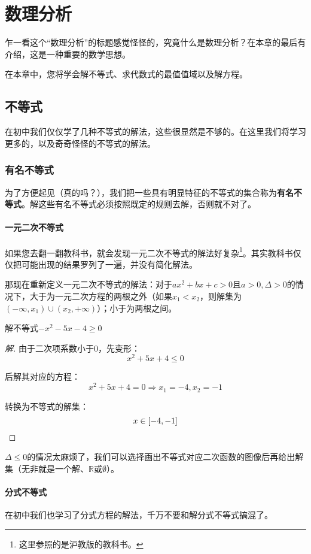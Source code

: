 \chapter{数理分析}
乍一看这个“数理分析”的标题感觉怪怪的，究竟什么是数理分析？在本章的最后有介绍，这是一种重要的数学思想。

在本章中，您将学会解不等式、求代数式的最值值域以及解方程。

\section{不等式}
在初中我们仅仅学了几种不等式的解法，这些很显然是不够的。在这里我们将学习更多的，以及奇奇怪怪的不等式的解法。

\subsection[有名]{有名不等式}
为了方便起见（真的吗？），我们把一些具有明显特征的不等式的集合称为\textbf{有名不等式}。解这些有名不等式必须按照既定的规则去解，否则就不对了。

\subsubsection{一元二次不等式}
如果您去翻一翻教科书，就会发现一元二次不等式的解法好复杂\footnote{这里参照的是沪教版的教科书。}。其实教科书仅仅把可能出现的结果罗列了一遍，并没有简化解法。

那现在重新定义一元二次不等式的解法：对于$ax^2+bx+c>0$且$a>0,\Delta>0$的情况下，大于为一元二次方程的两根之外（如果$x_1<x_2$，则解集为$(-\infty,x_1)\cup(x_2,+\infty)$）；小于为两根之间。

\begin{example}
	解不等式$-x^2-5x-4\geq0$
\end{example}
\begin{proof}[解]
	由于二次项系数小于$0$，先变形：\[x^2+5x+4\leq0\]

	后解其对应的方程：\[x^2+5x+4=0\Rightarrow x_1=-4,x_2=-1\]

	转换为不等式的解集：\[x\in[-4,-1]\qedhere\]
\end{proof}

$\Delta\leq0$的情况太麻烦了，我们可以选择画出不等式对应二次函数的图像后再给出解集（无非就是一个解、$\mathbb{R}$或$\emptyset$）。

\subsubsection{分式不等式}
在初中我们也学习了分式方程的解法，千万不要和解分式不等式搞混了。

